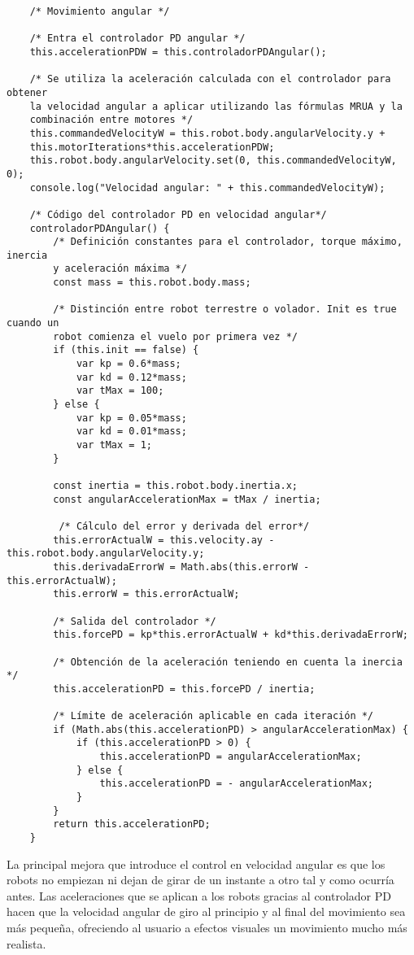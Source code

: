 \footnotesize {
\begin{verbatim}
    /* Movimiento angular */
     
    /* Entra el controlador PD angular */              
    this.accelerationPDW = this.controladorPDAngular();
    
    /* Se utiliza la aceleración calculada con el controlador para obtener 
    la velocidad angular a aplicar utilizando las fórmulas MRUA y la 
    combinación entre motores */
    this.commandedVelocityW = this.robot.body.angularVelocity.y + 
    this.motorIterations*this.accelerationPDW;
    this.robot.body.angularVelocity.set(0, this.commandedVelocityW, 0);
    console.log("Velocidad angular: " + this.commandedVelocityW);
    
    /* Código del controlador PD en velocidad angular*/
    controladorPDAngular() {
        /* Definición constantes para el controlador, torque máximo, inercia 
        y aceleración máxima */
        const mass = this.robot.body.mass;
        
        /* Distinción entre robot terrestre o volador. Init es true cuando un 
        robot comienza el vuelo por primera vez */   
        if (this.init == false) {
    	    var kp = 0.6*mass;
    	    var kd = 0.12*mass;
    	    var tMax = 100;
        } else {
    	    var kp = 0.05*mass;
    	    var kd = 0.01*mass;
    	    var tMax = 1;
        }

        const inertia = this.robot.body.inertia.x;
        const angularAccelerationMax = tMax / inertia;

         /* Cálculo del error y derivada del error*/
        this.errorActualW = this.velocity.ay - this.robot.body.angularVelocity.y; 
        this.derivadaErrorW = Math.abs(this.errorW - this.errorActualW);
        this.errorW = this.errorActualW;

        /* Salida del controlador */
        this.forcePD = kp*this.errorActualW + kd*this.derivadaErrorW;
        
        /* Obtención de la aceleración teniendo en cuenta la inercia */
        this.accelerationPD = this.forcePD / inertia;

        /* Límite de aceleración aplicable en cada iteración */
        if (Math.abs(this.accelerationPD) > angularAccelerationMax) {
            if (this.accelerationPD > 0) {
                this.accelerationPD = angularAccelerationMax;
            } else {
                this.accelerationPD = - angularAccelerationMax;
            }
        }
        return this.accelerationPD;
    }
\end{verbatim}
}

\normalsize
La principal mejora que introduce el control en velocidad angular es que los robots no empiezan ni dejan de girar de un instante a otro tal y como ocurría antes. Las aceleraciones que se aplican a los robots gracias al controlador PD hacen que la velocidad angular de giro al principio y al final del movimiento sea más pequeña, ofreciendo al usuario a efectos visuales un movimiento mucho más realista.